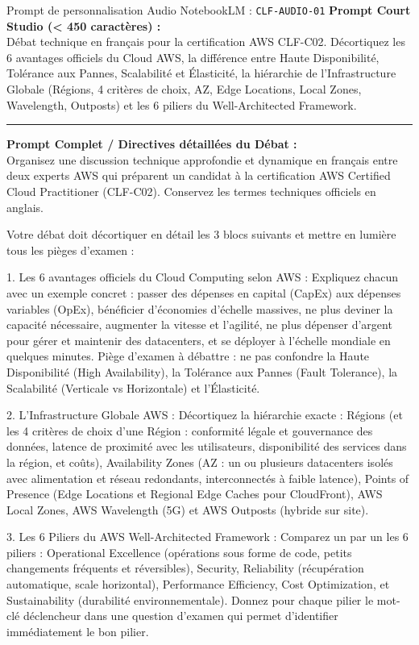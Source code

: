 \documentclass[11pt,a4paper]{article}
\begin{document}
\begin{promptbox}{Prompt de personnalisation Audio NotebookLM : \texttt{CLF-AUDIO-01}}
\textbf{Prompt Court Studio (< 450 caractères) :}\\
Débat technique en français pour la certification AWS CLF-C02. Décortiquez les 6 avantages officiels du Cloud AWS, la différence entre Haute Disponibilité, Tolérance aux Pannes, Scalabilité et Élasticité, la hiérarchie de l'Infrastructure Globale (Régions, 4 critères de choix, AZ, Edge Locations, Local Zones, Wavelength, Outposts) et les 6 piliers du Well-Architected Framework.

\medskip\hrule\medskip
\textbf{Prompt Complet / Directives détaillées du Débat :}\\
Organisez une discussion technique approfondie et dynamique en français entre deux experts AWS qui préparent un candidat à la certification AWS Certified Cloud Practitioner (CLF-C02). Conservez les termes techniques officiels en anglais.

Votre débat doit décortiquer en détail les 3 blocs suivants et mettre en lumière tous les pièges d'examen :

1. Les 6 avantages officiels du Cloud Computing selon AWS :
Expliquez chacun avec un exemple concret : passer des dépenses en capital (CapEx) aux dépenses variables (OpEx), bénéficier d'économies d'échelle massives, ne plus deviner la capacité nécessaire, augmenter la vitesse et l'agilité, ne plus dépenser d'argent pour gérer et maintenir des datacenters, et se déployer à l'échelle mondiale en quelques minutes.
Piège d'examen à débattre : ne pas confondre la Haute Disponibilité (High Availability), la Tolérance aux Pannes (Fault Tolerance), la Scalabilité (Verticale vs Horizontale) et l'Élasticité.

2. L'Infrastructure Globale AWS :
Décortiquez la hiérarchie exacte : Régions (et les 4 critères de choix d'une Région : conformité légale et gouvernance des données, latence de proximité avec les utilisateurs, disponibilité des services dans la région, et coûts), Availability Zones (AZ : un ou plusieurs datacenters isolés avec alimentation et réseau redondants, interconnectés à faible latence), Points of Presence (Edge Locations et Regional Edge Caches pour CloudFront), AWS Local Zones, AWS Wavelength (5G) et AWS Outposts (hybride sur site).

3. Les 6 Piliers du AWS Well-Architected Framework :
Comparez un par un les 6 piliers : Operational Excellence (opérations sous forme de code, petits changements fréquents et réversibles), Security, Reliability (récupération automatique, scale horizontal), Performance Efficiency, Cost Optimization, et Sustainability (durabilité environnementale). Donnez pour chaque pilier le mot-clé déclencheur dans une question d'examen qui permet d'identifier immédiatement le bon pilier.
\end{promptbox}
\end{document}
